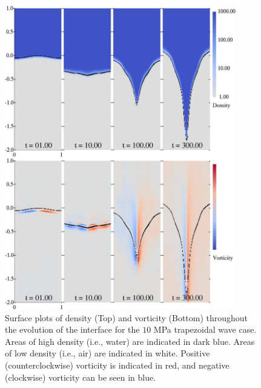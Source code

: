 \begin{figure}[h] 
  \centering
\includegraphics[width=0.9\textwidth]{./figs/lung_figs/snapshots_t1}
\caption[The evolution of the acoustically perturbed interface and vorticity field]{Surface plots of density (Top) and vorticity (Bottom)
  throughout the evolution of the interface for the $10$ MPa
  trapezoidal wave case. Areas of high density (i.e., water) are
indicated in dark blue. Areas of low density (i.e., air) are indicated
in white.  Positive (counterclockwise) vorticity is indicated in red,
and negative (clockwise) vorticity can be seen in blue.}
  \label{fig:interface_snapshots}
\end{figure}
%
